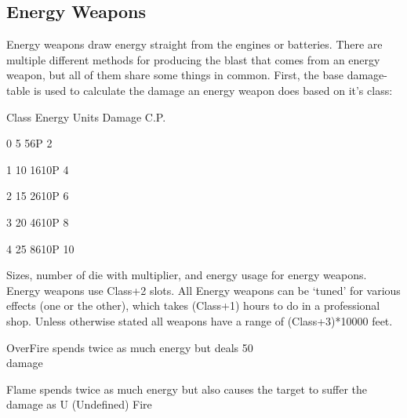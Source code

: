 \documentclass[twoside]{book}
\begin{document}
            
\subsection{Energy Weapons}
      Energy weapons draw energy straight from the
               engines or batteries. There are multiple different methods
               for producing the blast that comes from an energy weapon,
               but all of them share some things in common. First, the
               base damage-table is used to calculate the damage an
               energy weapon does based on it's class:   
                
                  
                   Class   
                   Energy Units   
                   Damage 
                   C.P.   
                  
                  
                   0 
                   5   
                   56P 
                   2   
                  
                  
                   1 
                   10   
                   1610P 
                   4   
                  
                  
                   2 
                   15   
                   2610P 
                   6   
                  
                  
                   3 
                   20   
                   4610P 
                   8   
                  
                  
                   4 
                   25   
                   8610P 
                   10   
                  
                
                Sizes, number of die with multiplier, and
                 energy usage for energy weapons.
              Energy weapons use Class+2 slots.   All Energy weapons can be `tuned' for
               various effects (one or the other), which takes (Class+1)
               hours to do in a professional shop. Unless otherwise
               stated all weapons have a range of (Class+3)*10000 feet.
                 
              
                 OverFire   
                  spends twice as much energy but deals 50\\%
                 damage 
                
              
                 Flame   
                  spends twice as much energy but also causes the
                 target to suffer the damage as U (Undefined) Fire
                 
\end{document}
